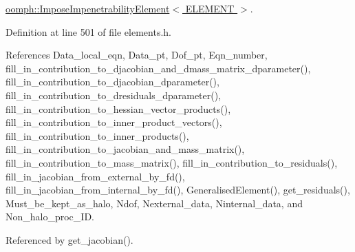 \hyperlink{classoomph_1_1ImposeImpenetrabilityElement_a9a53b713347bdb2b9c04692ea708eb01}{oomph\+::\+Impose\+Impenetrability\+Element$<$ E\+L\+E\+M\+E\+N\+T $>$}.



Definition at line 501 of file elements.\+h.



References Data\+\_\+local\+\_\+eqn, Data\+\_\+pt, Dof\+\_\+pt, Eqn\+\_\+number, fill\+\_\+in\+\_\+contribution\+\_\+to\+\_\+djacobian\+\_\+and\+\_\+dmass\+\_\+matrix\+\_\+dparameter(), fill\+\_\+in\+\_\+contribution\+\_\+to\+\_\+djacobian\+\_\+dparameter(), fill\+\_\+in\+\_\+contribution\+\_\+to\+\_\+dresiduals\+\_\+dparameter(), fill\+\_\+in\+\_\+contribution\+\_\+to\+\_\+hessian\+\_\+vector\+\_\+products(), fill\+\_\+in\+\_\+contribution\+\_\+to\+\_\+inner\+\_\+product\+\_\+vectors(), fill\+\_\+in\+\_\+contribution\+\_\+to\+\_\+inner\+\_\+products(), fill\+\_\+in\+\_\+contribution\+\_\+to\+\_\+jacobian\+\_\+and\+\_\+mass\+\_\+matrix(), fill\+\_\+in\+\_\+contribution\+\_\+to\+\_\+mass\+\_\+matrix(), fill\+\_\+in\+\_\+contribution\+\_\+to\+\_\+residuals(), fill\+\_\+in\+\_\+jacobian\+\_\+from\+\_\+external\+\_\+by\+\_\+fd(), fill\+\_\+in\+\_\+jacobian\+\_\+from\+\_\+internal\+\_\+by\+\_\+fd(), Generalised\+Element(), get\+\_\+residuals(), Must\+\_\+be\+\_\+kept\+\_\+as\+\_\+halo, Ndof, Nexternal\+\_\+data, Ninternal\+\_\+data, and Non\+\_\+halo\+\_\+proc\+\_\+\+ID.



Referenced by get\+\_\+jacobian().

\mbox{\label{classoomph_1_1GeneralisedElement_a2b6294a730647cf865da94f2531466f8}} 
